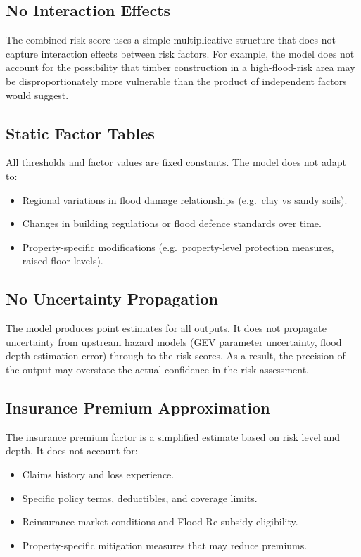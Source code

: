 \documentclass[11pt,a4paper]{article}
\begin{document}
\subsection{No Interaction Effects}

The combined risk score uses a simple multiplicative structure that does not capture interaction effects between risk factors. For example, the model does not account for the possibility that timber construction in a high-flood-risk area may be disproportionately more vulnerable than the product of independent factors would suggest.

\subsection{Static Factor Tables}

All thresholds and factor values are fixed constants. The model does not adapt to:

\begin{itemize}
    \item Regional variations in flood damage relationships (e.g.\ clay vs sandy soils).
    \item Changes in building regulations or flood defence standards over time.
    \item Property-specific modifications (e.g.\ property-level protection measures, raised floor levels).
\end{itemize}

\subsection{No Uncertainty Propagation}

The model produces point estimates for all outputs. It does not propagate uncertainty from upstream hazard models (GEV parameter uncertainty, flood depth estimation error) through to the risk scores. As a result, the precision of the output may overstate the actual confidence in the risk assessment.

\subsection{Insurance Premium Approximation}

The insurance premium factor is a simplified estimate based on risk level and depth. It does not account for:

\begin{itemize}
    \item Claims history and loss experience.
    \item Specific policy terms, deductibles, and coverage limits.
    \item Reinsurance market conditions and Flood Re subsidy eligibility.
    \item Property-specific mitigation measures that may reduce premiums.
\end{itemize}
\end{document}
